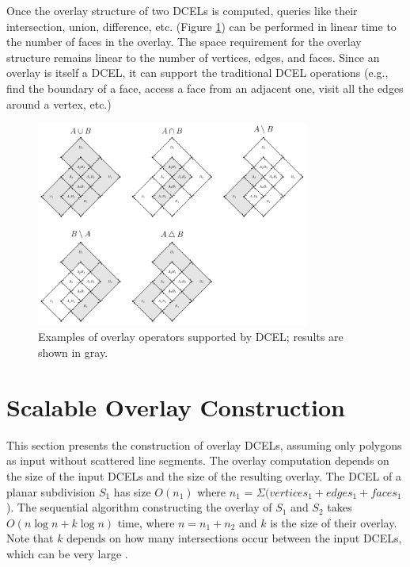 Once the overlay structure of two DCELs is computed, queries like their intersection, union, difference, etc. (Figure \ref{fig:dcel_operators}) can be performed in linear time to the number of faces in the overlay. The space requirement for the overlay structure remains linear to the number of vertices, edges, and faces. Since an overlay is itself a DCEL, it can support the traditional DCEL operations (e.g., find the boundary of a face, access a face from an adjacent one, visit all the edges around a vertex, etc.)

\begin{figure}
    \centering
    \includegraphics[width=0.8\textwidth]{chapter2/dcel_operators.pdf}
    \caption{Examples of overlay operators supported by DCEL; results are shown in gray.}
    \label{fig:dcel_operators}
\end{figure}

\section{Scalable Overlay Construction} \label{sec:methods}

This section presents the construction of overlay DCELs, assuming only polygons as input without scattered line segments. The overlay computation depends on the size of the input DCELs and the size of the resulting overlay. The DCEL of a planar subdivision $S_1$ has size $O(n_1)$ where $n_1$ = $\Sigma (vertices_1 + edges_1 + faces_1$).  The sequential algorithm constructing the overlay of $S_1$ and $S_2$ takes $O(n \log n + k \log n)$ time, where $n = n_1 + n_2$ and $k$ is the size of their overlay.  Note that $k$ depends on how many intersections occur between the input DCELs, which can be very large \cite{berg_computational_2008}. 

